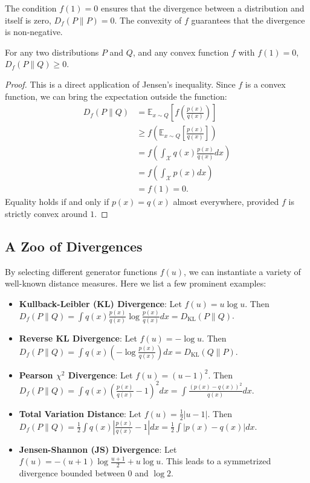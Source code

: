 The condition $f(1) = 0$ ensures that the divergence between a distribution and itself is zero, $D_f(P \parallel P) = 0$. The convexity of $f$ guarantees that the divergence is non-negative.

\begin{theorem}
For any two distributions $P$ and $Q$, and any convex function $f$ with $f(1)=0$, $D_f(P \parallel Q) \ge 0$.
\end{theorem}
\begin{proof}
This is a direct application of Jensen's inequality. Since $f$ is a convex function, we can bring the expectation outside the function:
\begin{align*}
    D_f(P \parallel Q) &= \mathbb{E}_{x \sim Q} \left[ f\left( \frac{p(x)}{q(x)} \right) \right] \\
                       &\ge f\left( \mathbb{E}_{x \sim Q} \left[ \frac{p(x)}{q(x)} \right] \right) \\
                       &= f\left( \int_{\mathcal{X}} q(x) \frac{p(x)}{q(x)} dx \right) \\
                       &= f\left( \int_{\mathcal{X}} p(x) dx \right) \\
                       &= f(1) = 0.
\end{align*}
Equality holds if and only if $p(x) = q(x)$ almost everywhere, provided $f$ is strictly convex around $1$.
\end{proof}

\subsection{A Zoo of Divergences}
By selecting different generator functions $f(u)$, we can instantiate a variety of well-known distance measures. Here we list a few prominent examples:

\begin{itemize}
    \item \textbf{Kullback-Leibler (KL) Divergence}: Let $f(u) = u \log u$. Then $D_f(P \parallel Q) = \int q(x) \frac{p(x)}{q(x)} \log \frac{p(x)}{q(x)} dx = D_{\text{KL}}(P \parallel Q)$.
    \item \textbf{Reverse KL Divergence}: Let $f(u) = -\log u$. Then $D_f(P \parallel Q) = \int q(x) \left(-\log \frac{p(x)}{q(x)}\right) dx = D_{\text{KL}}(Q \parallel P)$.
    \item \textbf{Pearson $\chi^2$ Divergence}: Let $f(u) = (u-1)^2$. Then $D_f(P \parallel Q) = \int q(x) \left(\frac{p(x)}{q(x)} - 1\right)^2 dx = \int \frac{(p(x)-q(x))^2}{q(x)} dx$.
    \item \textbf{Total Variation Distance}: Let $f(u) = \frac{1}{2}|u-1|$. Then $D_f(P \parallel Q) = \frac{1}{2} \int q(x) \left|\frac{p(x)}{q(x)} - 1\right| dx = \frac{1}{2} \int |p(x) - q(x)| dx$.
    \item \textbf{Jensen-Shannon (JS) Divergence}: Let $f(u) = -(u+1)\log\frac{u+1}{2} + u\log u$. This leads to a symmetrized divergence bounded between $0$ and $\log 2$.
\end{itemize}

